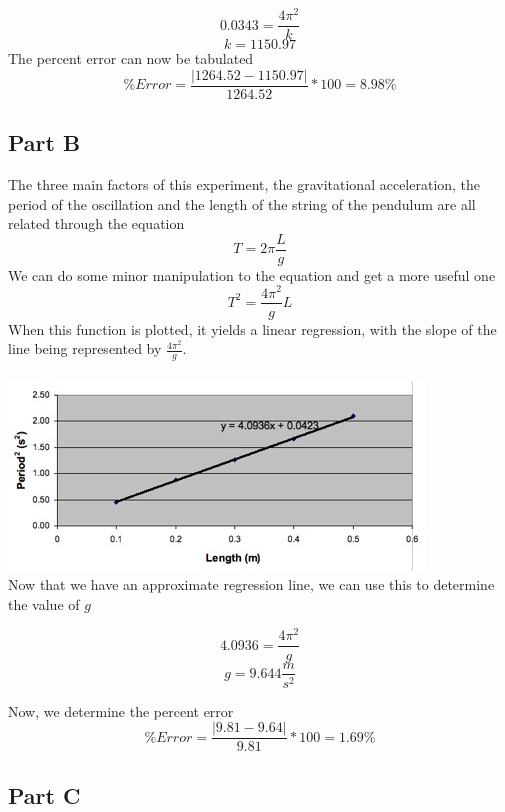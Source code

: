 \documentclass[titlepage]{article}
\begin{document}
\[
	0.0343 = \frac{4 \pi^2}{k}
\]
\[
	k = 1150.97
\]
The percent error can now be tabulated
\[
	\% Error = \frac{|1264.52 - 1150.97|}{1264.52} * 100 = 8.98\%
\]

\subsection{Part B}\label{sub:part_b}
The three main factors of this experiment, the gravitational acceleration, the period of the oscillation and the length of the string of the pendulum are all related through the equation
\begin{equation}
	T = 2 \pi \frac{L}{g}
\end{equation}
We can do some minor manipulation to the equation and get a more useful one
\begin{equation}
	T^2 = \frac{4 \pi^2}{g} L
\end{equation}
When this function is plotted, it yields a linear regression, with the slope of the line being represented by $\frac{4 \pi^2}{g}$.
\\
\\
\includegraphics{graphB.jpg}
\\
Now that we have an approximate regression line, we can use this to determine the value of $g$

\[
	4.0936 = \frac{4 \pi^2}{g}
\]
\[
	g = 9.644 \frac{m}{s^2}
\]

Now, we determine the percent error
\[
	\% Error = \frac{|9.81 - 9.64|}{9.81} * 100 = 1.69\%
\]

\subsection{Part C}\label{sub:part_c}
\end{document}
